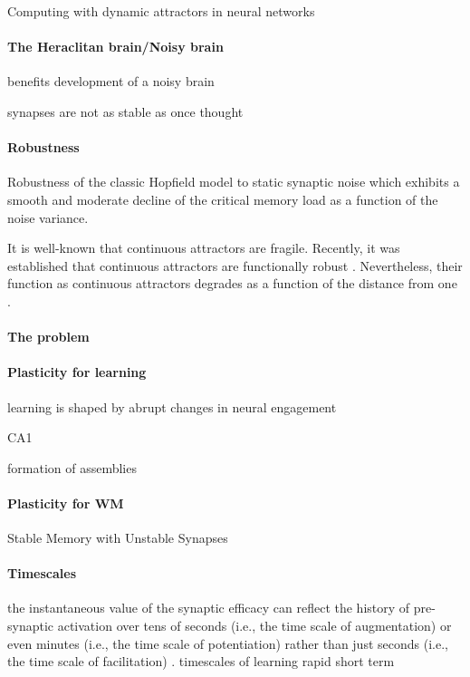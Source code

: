 \documentclass{article}
\theoremstyle{definition} \newtheorem{definition}{Definition}
\theoremstyle{remark} \newtheorem{remark}{Remark}
\newcounter{ct}
\begin{document}
Computing with dynamic attractors in neural networks \citep{hirsch1995computing}

\paragraph{The Heraclitan brain/Noisy brain}
\citep{cheung2010noisybrain}
\citep{rolls2010noisybrain}
benefits\citep{mcdonnell2011benefits}
development of a noisy brain \citep{mcintosh2010development}

synapses are not as stable as once thought \citep{susman2019memory}


\paragraph{Robustness}
Robustness of the classic Hopfield model to static synaptic noise\citep{sompolinsky1986neural, tirozzi1991chaos}
which exhibits a smooth and moderate decline of the critical memory load as a function of the noise variance.

It is well-known that continuous attractors are fragile. 
Recently, it was established that continuous attractors are functionally robust \citep{Sagodi2024a}.
Nevertheless, their function as continuous attractors degrades as a function of the distance from one \citep{Sagodi2024a}.

\paragraph{The problem}


\paragraph{Plasticity for learning}
learning is shaped by abrupt changes in neural engagement \citep{hennig2021learning}

CA1 \citep{bittner2017behavioral} 

formation of assemblies \citep{litwin2014formation}


\paragraph{Plasticity for WM}
\citep{kilpatrick2018wm}

Stable Memory with Unstable Synapses \citep{susman2019memory}

\paragraph{Timescales}
the instantaneous value of the synaptic efficacy can reflect the history of pre-synaptic activation over tens of seconds (i.e., the time scale of augmentation) or even minutes (i.e., the time scale of potentiation) rather than just seconds (i.e., the time scale of facilitation)  \citep{thomson2000facilitation}.
timescales of learning\citep{miller2024timescales}
rapid \citep{li2023rapid} \citep{dan2024neural} 
short term \citep{fioravante2011short}
\citep{brennan2023attractor}
\end{document}
